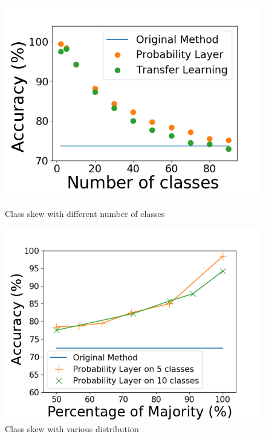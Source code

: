 \documentclass[pageno]{jpaper}
\begin{document}
\begin{figure}[!tbp]
  \centering
  \begin{minipage}[b]{0.235\textwidth}
    \centering
    \includegraphics[width=\textwidth]{PLvsRetrain.png}
    \caption{Class skew with different number of classes}
    \label{fig:PLvsRetrain}
  \end{minipage}
  \hfill
  \begin{minipage}[b]{0.235\textwidth}
    \centering
    \includegraphics[width=\textwidth]{variousDistribution.png}
    \caption{Class skew with various distribution}
    \label{fig:variousDistribution}
  \end{minipage}
\end{figure}
\end{document}
